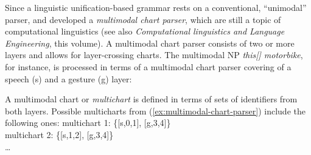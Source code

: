 \documentclass[output=paper]{langsci/langscibook}
\begin{document}
Since a linguistic unification-based grammar rests on a conventional, \enquote{unimodal} parser, \citet{Johnston:1998} and \citet{Johnston:et:al:1997} developed a \emph{multimodal chart parser}, which are still a topic of computational linguistics \citep{Alahverdzhieva:Flickinger:Lascarides:2012} (see also \textit{Computational linguistics and Language Engineering}, this volume).
%
A multimodal chart parser consists of two or more layers and allows for layer-crossing charts.
%
The multimodal NP \textit{this[\Pointing] motorbike}, for instance, is processed in terms of a multimodal chart parser covering of a speech (s) and a gesture (g) layer:
%
\ea \label{ex:multimodal-chart-parser}
\z

A multimodal chart or \emph{multichart} is defined in terms of sets of identifiers from both layers.
%
Possible multicharts from (\ref{ex:multimodal-chart-parser}) include the following ones:
%
\ea
multichart 1: \{[s,0,1], [g,3,4]\} \\
multichart 2: \{[s,1,2], [g,3,4]\} \\
\ldots
\z
{}

\end{document}
